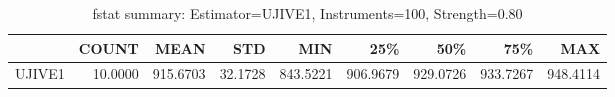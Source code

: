 \begin{table}[ht]
\centering
\caption{fstat summary: Estimator=UJIVE1, Instruments=100, Strength=0.80}
\begin{tabular}{lrrrrrrrr}
\toprule
 & COUNT & MEAN & STD & MIN & 25\% & 50\% & 75\% & MAX \\
\midrule
UJIVE1 & 10.0000 & 915.6703 & 32.1728 & 843.5221 & 906.9679 & 929.0726 & 933.7267 & 948.4114 \\
\bottomrule
\end{tabular}
\end{table}
